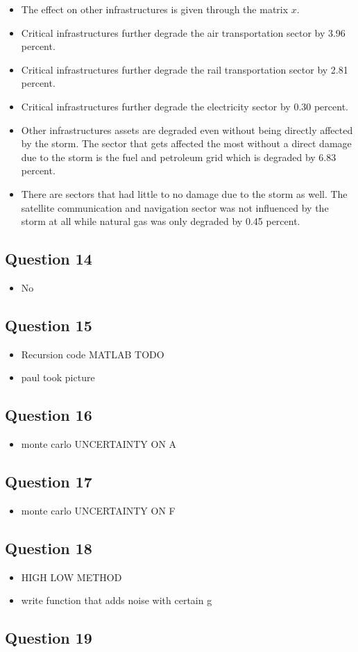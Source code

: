 \documentclass[11pt,a4paper]{article}
\begin{document}
\begin{itemize}
	\item The effect on other infrastructures is given through the matrix $x$.
	\item Critical infrastructures further degrade the air transportation sector by 3.96 percent.
	\item Critical infrastructures further degrade the rail transportation sector by 2.81 percent.
	\item Critical infrastructures further degrade the electricity sector by 0.30 percent.
	\item Other infrastructures assets are degraded even without being directly affected by the storm. The sector that gets affected the most without a direct damage due to the storm is the fuel and petroleum grid which is degraded by 6.83 percent.
	\item There are sectors that had little to no damage due to the storm as well. The satellite communication and navigation sector was not influenced by the storm at all while natural gas was only degraded by 0.45 percent.
\end{itemize}

\subsection*{Question 14}
\begin{itemize}
	\item No
\end{itemize}

\subsection*{Question 15}
\begin{itemize}
	\item Recursion code MATLAB TODO
	\item paul took picture
\end{itemize}

\subsection*{Question 16}
\begin{itemize}
	\item monte carlo UNCERTAINTY ON A
\end{itemize}

\subsection*{Question 17}
\begin{itemize}
	\item monte carlo UNCERTAINTY ON F
\end{itemize}

\subsection*{Question 18}
\begin{itemize}
	\item HIGH LOW METHOD
	\item write function that adds noise with certain g
\end{itemize}

\subsection*{Question 19}
\end{document}
